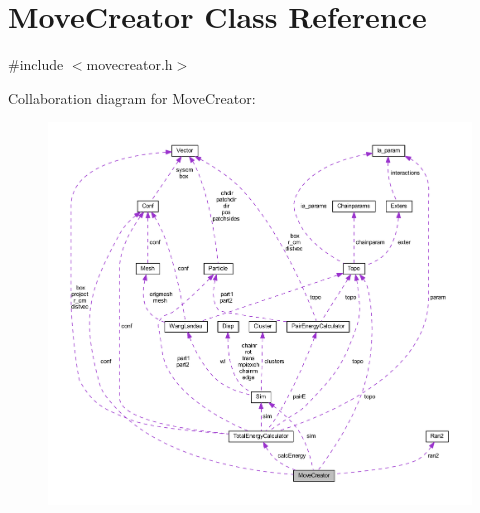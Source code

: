 \hypertarget{class_move_creator}{\section{Move\+Creator Class Reference}
\label{class_move_creator}
}


{\ttfamily \#include $<$movecreator.\+h$>$}



Collaboration diagram for Move\+Creator\+:\nopagebreak
\begin{figure}[H]
\begin{center}
\leavevmode
\includegraphics[width=350pt]{class_move_creator__coll__graph}
\end{center}
\end{figure}
